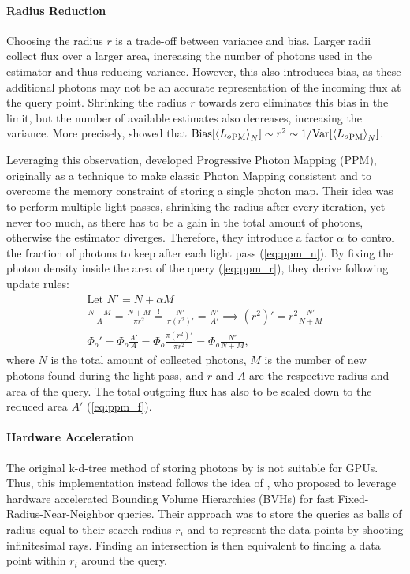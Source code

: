 \paragraph{Radius Reduction}
Choosing the radius $r$ is a trade-off between variance and bias.
Larger radii collect flux over a larger area, increasing the number of photons used in the estimator and thus reducing variance.
However, this also introduces bias, as these additional photons may not be an accurate representation of the incoming flux at the query point.
Shrinking the radius $r$ towards zero eliminates this bias in the limit, but the number of available estimates also decreases, increasing the variance.
More precisely, \textcite{knaus2011} showed that $\mathrm{Bias}\left[\estimator{{L_o}_\mathrm{PM}}\right] \sim r^2 \sim 1/\mathrm{Var}\left[\estimator{{L_o}_\mathrm{PM}}\right]$.

Leveraging this observation, \textcite{hachisuka2008} developed Progressive Photon Mapping (PPM), originally as a technique to make classic Photon Mapping consistent and to overcome the memory constraint of storing a single photon map.
Their idea was to perform multiple light passes, shrinking the radius after every iteration, yet never too much, as there has to be a gain in the total amount of photons, otherwise the estimator diverges.
Therefore, they introduce a factor $\alpha$ to control the fraction of photons to keep after each light pass (\cref{eq:ppm_n}).
By fixing the photon density inside the area of the query (\cref{eq:ppm_r}), they derive following update rules:
\begin{subequations}
\begin{align}
    \text{Let } N' = N + \alpha M \label{eq:ppm_n}\\
    \frac{N + M}{A} = \frac{N + M}{\pi r^2} \stackrel{!}{=} \frac{N'}{\pi (r^2)'} = \frac{N'}{A'} \implies (r^2)' = r^2 \frac{N'}{N + M} \label{eq:ppm_r}\\
    \Phi_o' = \Phi_o \frac{A'}{A} = \Phi_o \frac{\pi (r^2)'}{\pi r^2} = \Phi_o \frac{N'}{N + M}, \label{eq:ppm_f}
\end{align}
\end{subequations}
where $N$ is the total amount of collected photons, $M$ is the number of new photons found during the light pass, and $r$ and $A$ are the respective radius and area of the query.
The total outgoing flux has also to be scaled down to the reduced area $A'$ (\cref{eq:ppm_f}).

\paragraph{Hardware Acceleration}
The original k-d-tree method of storing photons by \textcite{jensen1996} is not suitable for GPUs.
Thus, this implementation instead follows the idea of \textcite{evangelou2021}, who proposed to leverage hardware accelerated Bounding Volume Hierarchies (BVHs) for fast Fixed-Radius-Near-Neighbor queries.
Their approach was to store the queries as balls of radius equal to their search radius $r_i$ and to represent the data points by shooting infinitesimal rays.
Finding an intersection is then equivalent to finding a data point within $r_i$ around the query.

